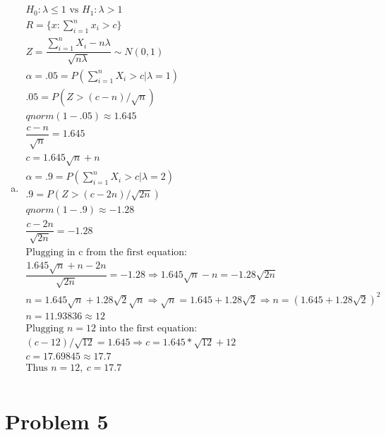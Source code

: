 \documentclass{article}
\newcommand{\lm}{\lambda}
\newcommand{\sumn}{\sum_{i=1}^{n}}
\newcommand{\sumx}{\sum_{i=1}^{n}x_i}
\newcommand{\hyp}[2]{H_0: #1 \text{ vs } H_1: #2}
\newcommand{\al}{\alpha}
\begin{document}
\begin{flushleft}
\begin{enumerate}[(a)]
	\item 
\begin{multline*}\\
\hyp{\lm \leq 1}{\lm>1}\\
R=\{x:\sumx>c \}\\
Z=\dfrac{\sumn X_i-n\lm}{\sqrt{n\lm}}\sim N(0,1)\\
\al=.05=P(\sumn X_i>c|\lm=1)\\
.05=P(Z>(c-n)/\sqrt{n})\\
qnorm(1-.05)\approx 1.645\\
\dfrac{c-n}{\sqrt{n}}=1.645\\
c=1.645\sqrt{n}+n\\
\al=.9=P(\sumn X_i>c|\lm=2)\\
.9=P(Z>(c-2n)/\sqrt{2n})\\
qnorm(1-.9)\approx -1.28\\
\dfrac{c-2n}{\sqrt{2n}}=-1.28\\
\text{Plugging in c from the first equation:}\\
\dfrac{1.645\sqrt{n}+n-2n}{\sqrt{2n}}=-1.28\Rightarrow
1.645\sqrt{n}-n=-1.28\sqrt{2n}\\
n=1.645\sqrt{n}+1.28\sqrt{2}\sqrt{n}\Rightarrow
\sqrt{n}=1.645+1.28\sqrt{2}\Rightarrow
n=(1.645+1.28\sqrt{2})^2\\
n=11.93836\approx 12\\
\text{Plugging } n=12 \text{ into the first equation:}\\
(c-12)/\sqrt{12}=1.645\Rightarrow
c=1.645*\sqrt{12}+12\\
c=17.69845\approx 17.7\\
\text{Thus } n=12, \ c=17.7\\
\end{multline*}

\end{enumerate}

	\section*{Problem 5}
	

\end{flushleft}
\end{document}
